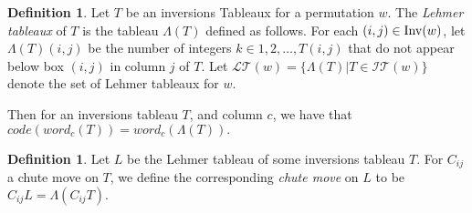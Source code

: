 \documentclass{article}
\theoremstyle{definition}
\newtheorem{definition}[theorem]{Definition} %
\begin{document}
\begin{definition}
Let $T$ be an inversions Tableaux for a permutation $w$. The \emph{Lehmer tableaux} of $T$ is the tableau $\Lambda(T)$ defined as follows. For each $(i,j)\in\mathrm{Inv}(w)$, let $\Lambda(T)(i,j)$ be the number of integers $k\in 1,2, \dots, T(i,j)$ that do not appear below box $(i,j)$ in column $j$ of $T$.  
Let $\mathcal{LT}(w)=\{\Lambda(T) | T \in \mathcal{IT}(w)\}$ denote the set of Lehmer tableaux for $w$.
\end{definition}

Then for an inversions tableau $T$, and column $c$, we have that $code(word_c(T)) = word_c(\Lambda(T)).$ 

\begin{definition}
    Let $L$ be the Lehmer tableau of some inversions tableau $T$. For $C_{ij}$ a chute move on $T$, we define the corresponding \emph{chute move} on $L$ to be
    $C_{ij} L = \Lambda (C_{ij} T).$
\end{definition}
\end{document}
